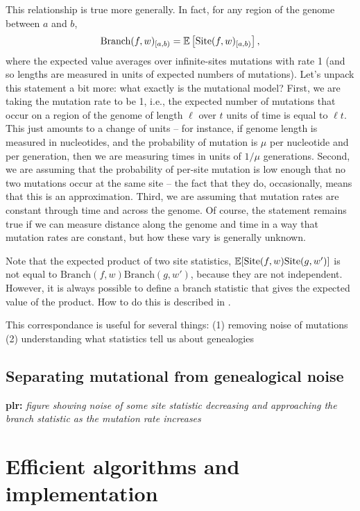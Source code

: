 \documentclass{article}
\newcommand{\branch}{\mbox{Branch}} %
\newcommand{\site}{\mbox{Site}} %
\newcommand{\iw}{w} %
\newcommand{\plr}[1]{{\color{blue}\textbf{plr:} \it #1}}
\begin{document}
This relationship is true more generally.
In fact, for any region of the genome between $a$ and $b$,
\begin{align}
    \branch(f, \iw)_{[a,b)}
    =
    \E\left[ \site(f, \iw)_{[a,b)} \right] ,
\end{align}
where the expected value averages over infinite-sites mutations with rate 1
(and so lengths are measured in units of expected numbers of mutations).
Let's unpack this statement a bit more: what exactly is the mutational model?
First, we are taking the mutation rate to be 1, i.e.,
the expected number of mutations that occur on a region of the genome of length $\ell$
over $t$ units of time is equal to $\ell t$.
This just amounts to a change of units --
for instance, if genome length is measured in nucleotides,
and the probability of mutation is $\mu$ per nucleotide and per generation,
then we are measuring times in units of $1/\mu$ generations.
Second, we are assuming that the probability of per-site mutation is low enough
that no two mutations occur at the same site
-- the fact that they do, occasionally, means that this is an approximation.
Third, we are assuming that mutation rates are constant through time and across the genome.
Of course, the statement remains true if we can measure distance along the genome and time
in a way that mutation rates are constant, but how these vary is generally unknown.

Note that the expected product of two site statistics,
$\E[\site(f, \iw) \site(g, \iw')]$
is not equal to $\branch(f, \iw) \branch(g, \iw')$,
because they are not independent.
However, it is always possible to define a branch statistic that
gives the expected value of the product.
How to do this is described in \citet{ralph2019empirical}.

This correspondance is useful for several things:
(1) removing noise of mutations
(2) understanding what statistics tell us about genealogies


\subsection*{Separating mutational from genealogical noise}

\plr{figure showing noise of some site statistic decreasing and approaching the branch statistic
    as the mutation rate increases}


\section*{Efficient algorithms and implementation}
\end{document}
